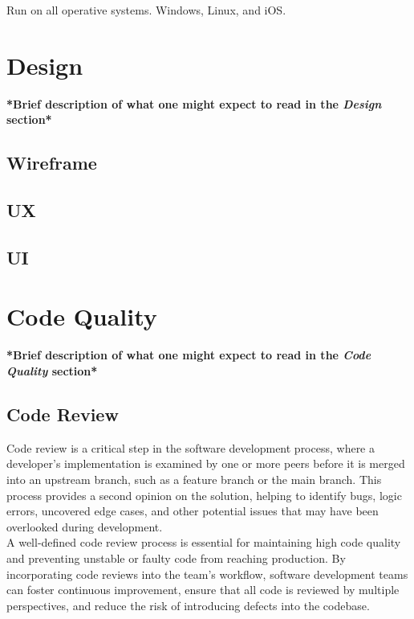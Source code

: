 Run on all operative systems. Windows, Linux, and iOS.

\section{Design}
\label{sec:design}

\textbf{*Brief description of what one might expect to read in the \textit{Design} section*}

\subsection{Wireframe}
\label{subsec:wireframe}

\subsection{UX}
\label{subsec:ux}

\subsection{UI}
\label{subsec:ui}

\section{Code Quality}
\label{sec:code-quality}

\textbf{*Brief description of what one might expect to read in the \textit{Code Quality} section*}

\subsection{Code Review}
\label{subsec:code-review}

Code review is a critical step in the software development process, where a developer's implementation is examined by one or more peers before it is merged into an upstream branch, such as a feature branch or the main branch. This process provides a second opinion on the solution, helping to identify bugs, logic errors, uncovered edge cases, and other potential issues that may have been overlooked during development. \cite{gitlab:code-review} \\

A well-defined code review process is essential for maintaining high code quality and preventing unstable or faulty code from reaching production. By incorporating code reviews into the team's workflow, software development teams can foster continuous improvement, ensure that all code is reviewed by multiple perspectives, and reduce the risk of introducing defects into the codebase. \cite{gitlab:code-review} \\

